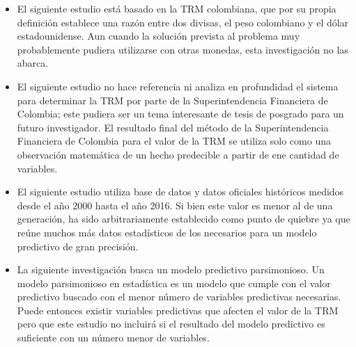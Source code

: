 \begin{itemize}
    \item El siguiente estudio está basado en la TRM colombiana, que por su propia definición establece una razón entre dos divisas, el peso colombiano y el dólar estadounidense. Aun cuando la solución prevista al problema muy probablemente pudiera utilizarse con otras monedas, esta investigación no las abarca.

    \item El siguiente estudio no hace referencia ni analiza en profundidad el sistema para determinar la TRM por parte de la Superintendencia Financiera de Colombia; este pudiera ser un tema interesante de tesis de posgrado para un futuro investigador. El resultado final del método de la Superintendencia Financiera de Colombia para el valor de la TRM se utiliza solo como una observación matemática de un hecho predecible a partir de ene cantidad de variables. 

    \item El siguiente estudio utiliza base de datos y datos oficiales históricos medidos desde el año 2000 hasta el año 2016. Si bien este valor es menor al de una generación, ha sido arbitrariamente establecido como punto de quiebre ya que reúne muchos más datos estadísticos de los necesarios para un modelo predictivo de gran precisión. 

    \item La siguiente investigación busca un modelo predictivo parsimonioso. Un modelo parsimonioso en estadística es un modelo que cumple con el valor predictivo buscado con el menor número de variables predictivas necesarias. Puede entonces existir variables predictivas que afecten el valor de la TRM pero que este estudio no incluirá si el resultado del modelo predictivo es suficiente con un número menor de variables.

\end{itemize}

